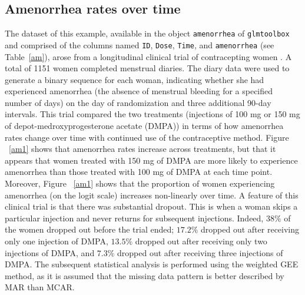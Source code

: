 


\subsection{Amenorrhea rates over time}
The dataset of this example, available in the object {\tt amenorrhea} of {\tt glmtoolbox} and comprised of the columns named {\tt ID}, {\tt Dose}, {\tt Time}, and {\tt amenorrhea} (see Table~\ref{am}), arose from a longitudinal clinical trial of contracepting women \citep{MFBC88,FLW11}. A total of 1151 women completed menstrual diaries. The diary data were used to generate a binary sequence for each woman, indicating whether she had experienced amenorrhea (the absence of menstrual bleeding for a specified number of days) on the day of randomization and three additional 90-day intervals. This trial compared the two treatments (injections of 100 mg or 150 mg of depot-medroxyprogesterone acetate (DMPA)) in terms of how amenorrhea rates change over time with continued use of the contraceptive method. Figure \!~\ref{am1} shows that amenorrhea rates increase across treatments, but that it appears that women treated with 150 mg of DMPA are more likely to experience amenorrhea than those treated with 100 mg of DMPA at each time point. Moreover, Figure \!~\ref{am1} shows that the proportion of women experiencing amenorrhea (on the logit scale) increases non-linearly over time. A feature of this clinical trial is that there was substantial dropout. This is when a woman skips a particular injection and never returns for subsequent injections. Indeed, $38\%$ of the women dropped out before the trial ended; $17.2\%$ dropped out after receiving only one injection of DMPA, $13.5\%$ dropped out after receiving only two injections of DMPA, and $7.3\%$ dropped out after receiving three injections of DMPA. The subsequent statistical analysis is performed using the weighted GEE method, as it is assumed that the missing data pattern is better described by MAR than MCAR.

